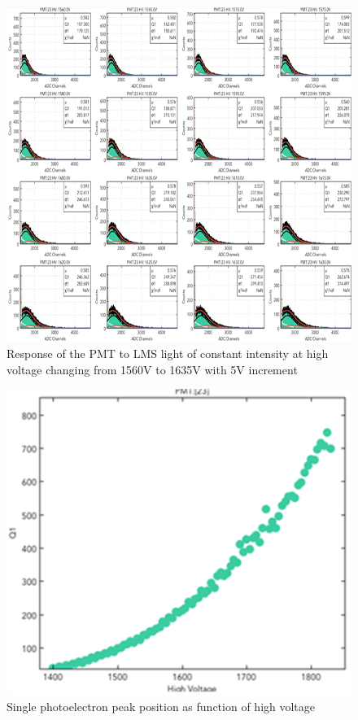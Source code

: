 \begin{figure}[ht]
\centering
\includegraphics[width=0.99\linewidth]{images/WILLIAM_2.png}
\caption{Response of the PMT to LMS light of constant intensity at high voltage changing from 1560V to 1635V with 5V increment}
\label{fig:WILLIAM_2}
\end{figure}

\begin{figure}[ht]
\centering
\includegraphics[width=0.99\linewidth]{images/WILLIAM_3.png}
\caption{Single photoelectron peak position as function of high voltage}
\label{fig:WILLIAM_3}
\end{figure}


